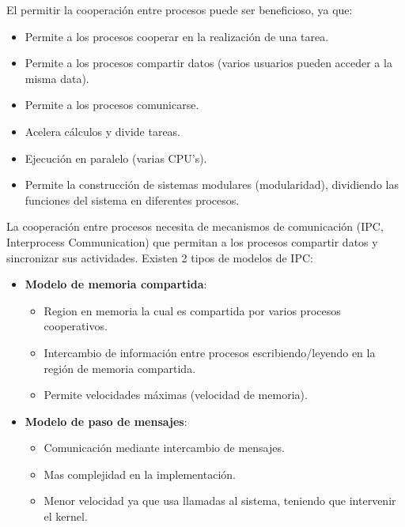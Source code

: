 \documentclass{templateNote}
\begin{document}
El permitir la cooperación entre procesos puede ser beneficioso, ya que:
\begin{itemize}
    \item Permite a los procesos cooperar en la realización de una tarea.
    \item Permite a los procesos compartir datos (varios usuarios pueden acceder a la misma data).
    \item Permite a los procesos comunicarse.
    \item Acelera cálculos y divide tareas.
    \item Ejecución en paralelo (varias CPU's).
    \item Permite la construcción de sistemas modulares (modularidad), dividiendo las funciones del sistema en diferentes procesos.
\end{itemize}

La cooperación entre procesos necesita de mecanismos de comunicación (IPC, Interprocess Communication) que permitan a los procesos compartir datos y sincronizar sus actividades. Existen 2 tipos de modelos de IPC:
\begin{itemize}
    \item \textbf{Modelo de memoria compartida}: 
    \begin{itemize}
        \item Region en memoria la cual es compartida por varios procesos cooperativos.
        \item Intercambio de información entre procesos escribiendo/leyendo en la región de memoria compartida.
        \item Permite velocidades máximas (velocidad de memoria).
    \end{itemize}
    \newpage
    \item \textbf{Modelo de paso de mensajes}:
    \begin{itemize}
        \item Comunicación mediante intercambio de mensajes.
        \item Mas complejidad en la implementación.
        \item Menor velocidad ya que usa llamadas al sistema, teniendo que intervenir el kernel.
    \end{itemize}
\end{itemize}
\end{document}
